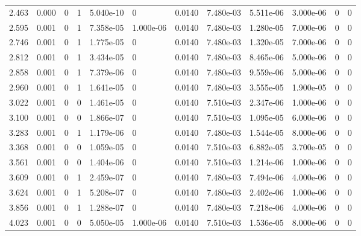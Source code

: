 \documentclass[preview]{standalone}
\begin{document}
{{\begin{tabular}{L{1.2cm}C{1.2cm} C{0.3cm}C{0.5cm} C{1.4cm}C{1.4cm} C{1.4cm}C{1.4cm} C{1.6cm}C{1.6cm} C{1.6cm}C{1.6cm}}
  2.463  &  0.000  & 0     &  1 &  5.040e-10  & 0  &  0.0140&   7.480e-03& 5.511e-06 & 3.000e-06   &  0 & 0  \\ 
  2.595  &  0.001  & 0     &  1 &  7.358e-05  & 1.000e-06  &  0.0140&   7.480e-03& 1.280e-05 & 7.000e-06   &  0 & 0  \\ 
  2.746  &  0.001  & 0     &  1 &  1.775e-05  & 0  &  0.0140&   7.480e-03& 1.320e-05 & 7.000e-06   &  0 & 0  \\ 
  2.812  &  0.001  & 0     &  1 &  3.434e-05  & 0  &  0.0140&   7.480e-03& 8.465e-06 & 5.000e-06   &  0 & 0  \\ 
  2.858  &  0.001  & 0     &  1 &  7.379e-06  & 0  &  0.0140&   7.480e-03& 9.559e-06 & 5.000e-06   &  0 & 0  \\ 
  2.960  &  0.001  & 0     &  1 &  1.641e-05  & 0  &  0.0140&   7.480e-03& 3.555e-05 & 1.900e-05   &  0 & 0  \\ 
  3.022  &  0.001  & 0     &  0 &  1.461e-05  & 0  &  0.0140&   7.510e-03& 2.347e-06 & 1.000e-06   &  0 & 0  \\ 
  3.100  &  0.001  & 0     &  0 &  1.866e-07  & 0  &  0.0140&   7.510e-03& 1.095e-05 & 6.000e-06   &  0 & 0  \\ 
  3.283  &  0.001  & 0     &  1 &  1.179e-06  & 0  &  0.0140&   7.480e-03& 1.544e-05 & 8.000e-06   &  0 & 0  \\ 
  3.368  &  0.001  & 0     &  0 &  1.059e-05  & 0  &  0.0140&   7.510e-03& 6.882e-05 & 3.700e-05   &  0 & 0  \\ 
  3.561  &  0.001  & 0     &  0 &  1.404e-06  & 0  &  0.0140&   7.510e-03& 1.214e-06 & 1.000e-06   &  0 & 0  \\ 
  3.609  &  0.001  & 0     &  1 &  2.459e-07  & 0  &  0.0140&   7.480e-03& 7.494e-06 & 4.000e-06   &  0 & 0  \\ 
  3.624  &  0.001  & 0     &  1 &  5.208e-07  & 0  &  0.0140&   7.480e-03& 2.402e-06 & 1.000e-06   &  0 & 0  \\ 
  3.856  &  0.001  & 0     &  1 &  1.288e-07  & 0  &  0.0140&   7.480e-03& 7.218e-06 & 4.000e-06   &  0 & 0  \\ 
  4.023  &  0.001  & 0     &  0 &  5.050e-05  & 1.000e-06  &  0.0140&   7.510e-03& 1.536e-05 & 8.000e-06   &  0 & 0  \\ 
\hline 
\end{tabular} 

}}
\end{document}
